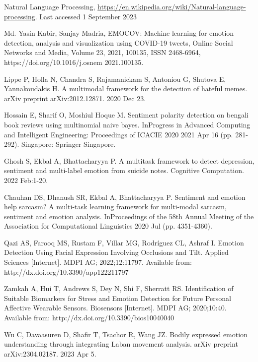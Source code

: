 \documentclass[runningheads]{llncs}
\begin{document}
%
%
%
% 
% 
%
\begin{thebibliography}{8}
Natural Language Processing, \url{https://en.wikipedia.org/wiki/Natural-language-processing}. Last accessed 1 September 2023

Md. Yasin Kabir, Sanjay Madria, EMOCOV: Machine learning for emotion detection, analysis and visualization using COVID-19 tweets, Online Social Networks and Media, Volume 23, 2021, 100135, ISSN 2468-6964, https://doi.org/10.1016/j.osnem 2021.100135.

Lippe P, Holla N, Chandra S, Rajamanickam S, Antoniou G, Shutova E, Yannakoudakis H. A multimodal framework for the detection of hateful memes. arXiv preprint arXiv:2012.12871. 2020 Dec 23.

Hossain E, Sharif O, Moshiul Hoque M. Sentiment polarity detection on bengali book reviews using multinomial naive bayes. InProgress in Advanced Computing and Intelligent Engineering: Proceedings of ICACIE 2020 2021 Apr 16 (pp. 281-292). Singapore: Springer Singapore.

Ghosh S, Ekbal A, Bhattacharyya P. A multitask framework to detect depression, sentiment and multi-label emotion from suicide notes. Cognitive Computation. 2022 Feb:1-20.

Chauhan DS, Dhanush SR, Ekbal A, Bhattacharyya P. Sentiment and emotion help sarcasm? A multi-task learning framework for multi-modal sarcasm, sentiment and emotion analysis. InProceedings of the 58th Annual Meeting of the Association for Computational Linguistics 2020 Jul (pp. 4351-4360).

Qazi AS, Farooq MS, Rustam F, Villar MG, Rodríguez CL, Ashraf I. Emotion Detection Using Facial Expression Involving Occlusions and Tilt. Applied Sciences [Internet]. MDPI AG; 2022;12:11797. Available from: http://dx.doi.org/10.3390/app122211797

Zamkah A, Hui T, Andrews S, Dey N, Shi F, Sherratt RS. Identification of Suitable Biomarkers for Stress and Emotion Detection for Future Personal Affective Wearable Sensors. Biosensors [Internet]. MDPI AG; 2020;10:40. Available from: http://dx.doi.org/10.3390/bios10040040

Wu C, Davaasuren D, Shafir T, Tsachor R, Wang JZ. Bodily expressed emotion understanding through integrating Laban movement analysis. arXiv preprint arXiv:2304.02187. 2023 Apr 5.


\end{thebibliography}
\end{document}
